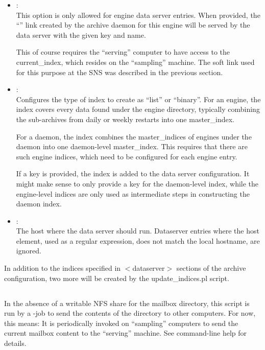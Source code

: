 \begin{itemize}
\item {}:\\
      This option is only allowed for engine data server entries.
      When provided, the ``'' link created by the
      archive daemon for this engine will be served by the
      data server with the given key and name.

      This of course requires the ``serving'' computer to have access
      to the current\_index, which resides on the ``sampling''
      machine. The soft link used for this purpose at the SNS was
      described in the previous section.
\item {}: \\
      Configures the type of index to create as ``list'' or ``binary''.
      For an engine, the index covers every data found under the engine
      directory, typically combining the sub-archives from daily or weekly
      restarts into one master\_index.

      For a daemon, the index combines the master\_indices of engines
      under the daemon into one daemon-level master\_index. This
      requires that there are such engine indices, which need to be
      configured for each engine entry.

      If a key is provided, the index is added to the data server
      configuration. It might make sense to only provide a key for the
      daemon-level index, while the engine-level indices are only used
      as intermediate steps in constructing the daemon index.            
\item {}: \\
      The host where the data server should run. Dataserver entries where
      the host element, used as a regular expression, does not match the
      local hostname, are ignored.
\end{itemize}

\noindent In addition to the indices specified in $<$dataserver$>$
sections of the archive configuration, two more will
be created by the update\_indices.pl script.

\subsection{}
In the absence of a writable NFS share for the mailbox directory,
this script is run by a -job to send the contents of the
 directory to other computers.
For now, this means: It is periodically invoked on ``sampling''
computers to send the current mailbox content to the ``serving''
machine. See command-line help for details.

